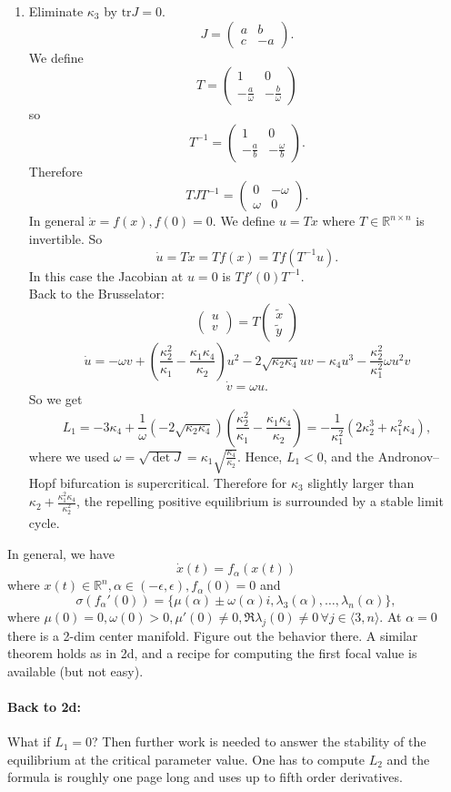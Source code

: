 \documentclass{article}
\newcommand*{\R}{\mathbb{R}}
\newcommand*{\jbr}[1]{{\langle #1 \rangle}}
\newcommand*{\reci}[1]{{\frac{1}{#1}}}
\newcommand*{\tr}{\text{tr}}
\newcommand{\vectwo}[2]{\begin{pmatrix} #1\\#2\end{pmatrix}}
\newcommand*{\mattwo}[4]{\begin{pmatrix}
    #1&#2\\#3&#4
\end{pmatrix}}
\begin{document}
\begin{exam}[Brusselator]
\begin{enumerate}
        \item Eliminate $\kappa_3$ by $\tr J = 0$.
        $$J = \mattwo abc{-a}.$$
        We define
        $$T=\mattwo10{-\frac a\omega}{-\frac b\omega}$$
        so
        $$T^{-1} = \mattwo10{-\frac ab}{-\frac\omega b}.$$
        Therefore
        $$TJT^{-1} = \mattwo0{-\omega}\omega0.$$
        In general $\dot x = f(x), f(0)=0$. We define $u = Tx$ where $T \in \R^{n\times n}$ is invertible. So
        $$\dot u = T\dot x = Tf(x) = Tf(T^{-1}u).$$
        In this case the Jacobian at $u = 0$ is $Tf'(0)T^{-1}$.\\
        Back to the Brusselator:
        $$\vectwo uv = T\vectwo{\tilde{x}}{\tilde{y}}$$
        $$\dot u = -\omega v+\left(\frac{\kappa_2^2}{\kappa_1}-\frac{\kappa_1\kappa_4}{\kappa_2}\right)u^2-2\sqrt{\kappa_2\kappa_4}uv-\kappa_4u^3-\frac{\kappa_2^2}{\kappa_1^2}\omega u^2v$$
        $$\dot v = \omega u.$$
        So we get
        $$L_1 = -3\kappa_4+\reci\omega(-2\sqrt{\kappa_2\kappa_4})\left(\frac{\kappa_2^2}{\kappa_1}-\frac{\kappa_1\kappa_4}{\kappa_2}\right)=-\frac{1}{\kappa_1^2}(2\kappa_2^3+\kappa_1^2\kappa_4),$$ where we used
        $\omega = \sqrt{\det J}=\kappa_1\sqrt{\frac{\kappa_4}{\kappa_2}}$. Hence, $L_1<0$, and the Andronov--Hopf bifurcation is supercritical. Therefore for $\kappa_3$ slightly larger than $\kappa_2+\frac{\kappa_1^2\kappa_4}{\kappa_2^2}$, the repelling positive equilibrium is surrounded by a stable limit cycle.
    \end{enumerate}
\end{exam}
In general, we have
$$\dot x(t) = f_\alpha(x(t))$$
where $x(t) \in \R^n, \alpha \in (-\epsilon, \epsilon), f_\alpha(0)=0$ and
$$\sigma(f_\alpha'(0))=\{\mu(\alpha)\pm \omega(\alpha)i, \lambda_3(\alpha),\dots, \lambda_n(\alpha)\},$$
where $\mu(0)=0, \omega(0)>0, \mu'(0)\neq 0, \Re \lambda_j(0)\neq 0 \, \forall j \in \jbr{3,n}$. At $\alpha = 0$ there is a 2-dim center manifold. Figure out the behavior there. A similar theorem holds as in 2d, and a recipe for computing the first focal value is available (but not easy).

\paragraph{Back to 2d:}
What if $L_1 = 0$? Then further work is needed to answer the stability of the equilibrium at the critical parameter value. One has to compute $L_2$ and the formula is roughly one page long and uses up to fifth order derivatives.
\end{document}

